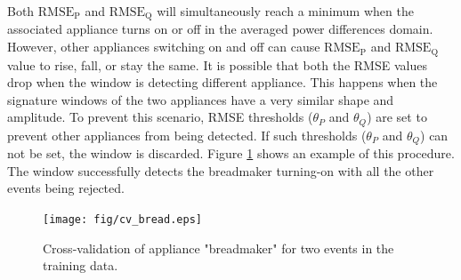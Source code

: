 \documentclass[conference]{IEEEtran}
\begin{document}
%
%		
%

Both $\text{RMSE}_{\text{P}}$ and $\text{RMSE}_{\text{Q}}$ will simultaneously reach a minimum when the associated appliance turns on or off in the averaged power differences domain. However, other appliances switching on and off can cause $\text{RMSE}_{\text{P}}$ and $\text{RMSE}_{\text{Q}}$ value to rise, fall, or stay the same.  It is possible that both the RMSE values drop when the window is detecting different appliance.  This happens when the signature windows of the two appliances have a very similar shape and amplitude.  To prevent this scenario, RMSE thresholds ($\theta_P$ and $\theta_Q$) are set to prevent other appliances from being detected.  If such thresholds ($\theta_P$ and $\theta_Q$) can not be set, the window is discarded.  Figure \ref{fig:bread} shows an example of this procedure. The window successfully detects the breadmaker turning-on with all the other events being rejected. 

\begin{figure}[!t]
	\centering
	\texttt{[image: fig/cv\_bread.eps]}
	\caption{Cross-validation of appliance "breadmaker" for two events in the training data.}
	\label{fig:bread}
\end{figure}
\end{document}
